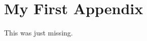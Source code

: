 \documentclass[english,bachelor]{webisthesis}
\begin{document}
\begin{frontmatter}


  \tableofcontents





\end{frontmatter}










\appendix
\chapter{My First Appendix}
This was just missing.

\end{document}
